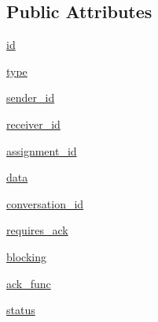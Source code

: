 \subsection*{Public Attributes}
\begin{DoxyCompactItemize}
\item 
\hyperlink{classparlai_1_1mturk_1_1core_1_1socket__manager_1_1Packet_ad10710f49279e55b1011f585fd07bc22}{id}
\item 
\hyperlink{classparlai_1_1mturk_1_1core_1_1socket__manager_1_1Packet_a6fbd30031c46914f55a9ccdec5b0c8a3}{type}
\item 
\hyperlink{classparlai_1_1mturk_1_1core_1_1socket__manager_1_1Packet_ae1bd1f29599a19fd8c64e2ef01ab77b4}{sender\+\_\+id}
\item 
\hyperlink{classparlai_1_1mturk_1_1core_1_1socket__manager_1_1Packet_ab45007199f720f99765a49771df71c58}{receiver\+\_\+id}
\item 
\hyperlink{classparlai_1_1mturk_1_1core_1_1socket__manager_1_1Packet_a1638aa8fb2f521dcc47a3c70bb4629d0}{assignment\+\_\+id}
\item 
\hyperlink{classparlai_1_1mturk_1_1core_1_1socket__manager_1_1Packet_a0da381513a2cef8db0a5cac7825aa8f4}{data}
\item 
\hyperlink{classparlai_1_1mturk_1_1core_1_1socket__manager_1_1Packet_a1131b2ba6f1534a3edd9f704ae5db107}{conversation\+\_\+id}
\item 
\hyperlink{classparlai_1_1mturk_1_1core_1_1socket__manager_1_1Packet_af0fd46eb878559d3ea82993aa4c2ad9a}{requires\+\_\+ack}
\item 
\hyperlink{classparlai_1_1mturk_1_1core_1_1socket__manager_1_1Packet_ace59fc70911f5349259a6e09541ef776}{blocking}
\item 
\hyperlink{classparlai_1_1mturk_1_1core_1_1socket__manager_1_1Packet_a676008ae4aaa55d7551a94d246b1b931}{ack\+\_\+func}
\item 
\hyperlink{classparlai_1_1mturk_1_1core_1_1socket__manager_1_1Packet_aeb61b559da8290c5f12c37dbf1fb08d2}{status}
\end{DoxyCompactItemize}
